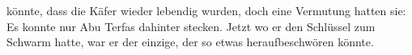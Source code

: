 könnte, dass die Käfer wieder lebendig wurden, doch eine Vermutung hatten sie: Es konnte nur Abu Terfas dahinter stecken. Jetzt wo er den Schlüssel zum Schwarm hatte, war er der einzige, der so etwas heraufbeschwören könnte.
% 
